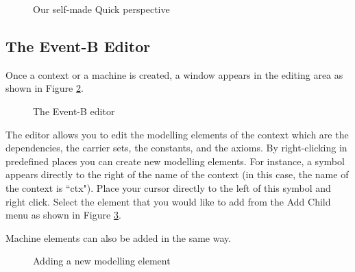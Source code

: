 \begin{figure}[!ht]
\begin{center}
	\caption{Our self-made Quick perspective}
	\label{fig_ref_10_customizing}
\end{center}
\end{figure}

\subsection{The Event-B Editor}
\label{new_eventb_editor}

Once a context or a machine is created, a window appears in the editing area as shown in Figure \ref{fig_ref_01_eventb_editor1_neweditor}.


\begin{figure}[!ht]
\begin{center}
	\caption{The Event-B editor}
	\label{fig_ref_01_eventb_editor1_neweditor}
\end{center}
\end{figure}

The editor allows you to edit the modelling elements of the context which are the dependencies, the carrier sets, the constants, and the axioms. By right-clicking in predefined places you can create new modelling elements. For instance, a  symbol appears directly to the right of the name of the context (in this case, the name of the context is ``ctx"). Place your cursor directly to the left of this symbol and right click. Select the element that you would like to add from the \textsf{Add Child} menu as shown in Figure \ref{fig_ref_01_neweditor_add_element}.

Machine elements can also be added in the same way. 

\begin{figure}[!ht]
\begin{center}
	\caption{Adding a new modelling element}
	\label{fig_ref_01_neweditor_add_element}
\end{center}
\end{figure}

